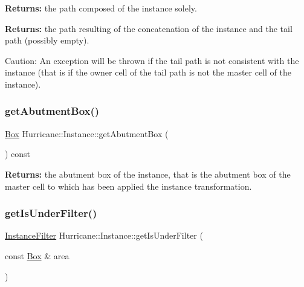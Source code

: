 {\bfseries Returns\+:} the path composed of the instance solely.

{\bfseries Returns\+:} the path resulting of the concatenation of the instance and the tail path (possibly empty).

\begin{DoxyParagraph}{Caution\+: An exception will be thrown if the tail path is not }
consistent with the instance (that is if the owner cell of the tail path is not the master cell of the instance). 
\end{DoxyParagraph}
\mbox{\label{classHurricane_1_1Instance_a29bedbd05939bf43757ef036bb506d01}} 
\subsubsection{\texorpdfstring{get\+Abutment\+Box()}{getAbutmentBox()}}
{\footnotesize\ttfamily \mbox{\hyperlink{classHurricane_1_1Box}{Box}} Hurricane\+::\+Instance\+::get\+Abutment\+Box (\begin{DoxyParamCaption}{ }\end{DoxyParamCaption}) const}

{\bfseries Returns\+:} the abutment box of the instance, that is the abutment box of the master cell to which has been applied the instance transformation. \mbox{\label{classHurricane_1_1Instance_ae2bc936dfecfaf70a0052959b4b2861e}} 
\subsubsection{\texorpdfstring{get\+Is\+Under\+Filter()}{getIsUnderFilter()}}
{\footnotesize\ttfamily \mbox{\hyperlink{namespaceHurricane_a889ec1441e1876d9addf89dfab32e772}{Instance\+Filter}} Hurricane\+::\+Instance\+::get\+Is\+Under\+Filter (\begin{DoxyParamCaption}\item[{const \mbox{\hyperlink{classHurricane_1_1Box}{Box}} \&}]{area }\end{DoxyParamCaption})\hspace{0.3cm}{\ttfamily [static]}}


